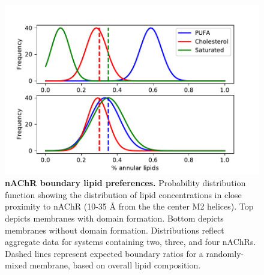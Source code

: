 \documentclass[final,3p,times,twocolumn]{elsarticle}
\begin{document}
\begin{figure}[H]
\centering
\includegraphics[width=.99\linewidth,trim={0cm 0cm 0cm 0.5cm}]{Figure1}
\caption[nAChR boundary lipid preferences.]{{\bf nAChR boundary lipid preferences.} Probability distribution function showing the distribution of lipid concentrations in close proximity to nAChR (10-35 {\AA}  from the the center M2 helices). Top depicts membranes with domain formation. Bottom depicts membranes without domain formation. Distributions reflect aggregate data for systems containing two, three, and four nAChRs. Dashed lines represent expected boundary ratios for a randomly-mixed membrane, based on overall lipid composition.}
  \label{fig:Figure2}
\end{figure}





\end{document}
